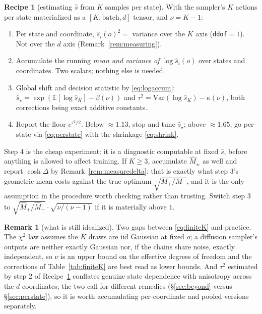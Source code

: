 \documentclass[11pt]{article}
\theoremstyle{definition}
\newtheorem{remark}[proposition]{Remark}
\newtheorem{recipe}[proposition]{Recipe}
\newcommand{\Var}{\mathrm{Var}}
\newcommand{\E}{\mathbb{E}}
\begin{document}
\begin{recipe}[estimating $\hat s$ from $K$ samples per state]
\label{rec:estimate}
With the sampler's $K$ actions per state materialized as a $[K,\text{batch},d]$
tensor, and $\nu=K-1$:
\begin{enumerate}\itemsep1pt
  \item Per state and coordinate, $\hat s_i(o)^2=$ variance over the $K$ axis
  (\texttt{ddof}$=1$). Not over the $d$ axis (Remark~\ref{rem:measuring}).
  \item Accumulate the running \emph{mean and variance of
  $\log\hat s_i(o)$} over states and coordinates. Two scalars; nothing else is
  needed.
  \item Global shift and decision statistic by \eqref{eq:logaccum}:
  $\hat s_\star=\exp(\E[\log\hat s_K]-\beta(\nu))$ and
  $\tau^2=\Var(\log\hat s_K)-\kappa(\nu)$, both corrections being exact additive
  constants.
  \item Report the floor $e^{\tau^2/2}$. Below $\approx1.13$, stop and tune
  $\hat s_\star$; above $\approx1.65$, go per-state via \eqref{eq:perstate} with
  the shrinkage \eqref{eq:shrink}.
\end{enumerate}
Step 4 is the cheap experiment: it is a diagnostic computable at fixed $\hat s$,
before anything is allowed to affect training. If $K\ge3$, accumulate
$\widehat M_\pm$ as well and report $\cosh\Delta$ by
Remark~\ref{rem:measuredelta}: that is exactly what step 3's geometric mean
costs against the true optimum $\sqrt{M_+/M_-}$, and it is the only assumption in
the procedure worth checking rather than trusting. Switch step 3 to
$\sqrt{\widehat M_+/\widehat M_-}\cdot\sqrt{\nu/(\nu-1)}$ if it is materially
above $1$.
\end{recipe}

\begin{remark}[what is still idealized]
Two gaps between \eqref{eq:finiteK} and practice. The $\chi^2$ law assumes the
$K$ draws are iid Gaussian at fixed $o$; a diffusion sampler's outputs are
neither exactly Gaussian nor, if the chains share noise, exactly independent, so
$\nu$ is an upper bound on the effective degrees of freedom and the corrections
of Table~\ref{tab:finiteK} are best read as lower bounds. And $\tau^2$ estimated
by step 2 of Recipe~\ref{rec:estimate} conflates genuine state dependence with
anisotropy across the $d$ coordinates; the two call for different remedies
(\S\ref{sec:beyond} versus \S\ref{sec:perstate}), so it is worth accumulating
per-coordinate and pooled versions separately.
\end{remark}
\end{document}
